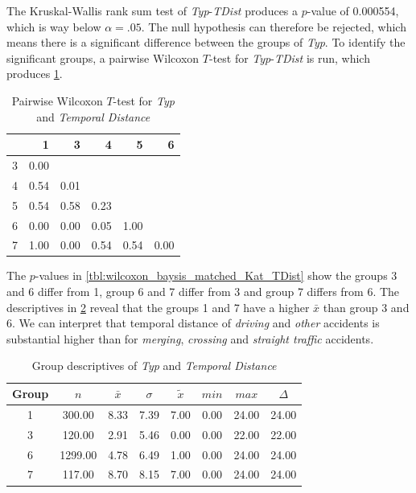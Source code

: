 The Kruskal-Wallis rank sum test of \textit{Typ}-\textit{TDist} produces a $p$-value of 0.000554, which is way below $\alpha=.05$. The null hypothesis can therefore be rejected, which means there is a significant difference between the groups of \textit{Typ}. To identify the significant groups, a pairwise Wilcoxon $T$-test for \textit{Typ}-\textit{TDist} is run, which produces \cref{tbl:wilcoxon_baysis_matched_Typ_TDist}. 
\begin{table}[ht]
	\tiny
	\centering
	\begin{tabular}{rrrrrr}
		\toprule
		& 1 & 3 & 4 & 5 & 6 \\ 
		\midrule
		3 & 0.00 &  &  &  &  \\ 
		4 & 0.54 & 0.01 &  &  &  \\ 
		5 & 0.54 & 0.58 & 0.23 &  &  \\ 
		6 & 0.00 & 0.00 & 0.05 & 1.00 &  \\ 
		7 & 1.00 & 0.00 & 0.54 & 0.54 & 0.00 \\ 
		\bottomrule
	\end{tabular}
	\caption{Pairwise Wilcoxon $T$-test for \textit{Typ} and \textit{Temporal Distance}}
	\label{tbl:wilcoxon_baysis_matched_Typ_TDist}
\end{table}
The $p$-values in \cref{tbl:wilcoxon_baysis_matched_Kat_TDist} show the groups 3 and 6 differ from 1, group 6 and 7 differ from 3 and group 7 differs from 6. The descriptives in \cref{tbl:descriptives_baysis_matched_Typ_TDist} reveal that the groups 1 and 7 have a higher $\bar{x}$ than group 3 and 6. We can interpret that temporal distance of \textit{driving} and \textit{other} accidents is substantial higher than for \textit{merging}, \textit{crossing} and \textit{straight traffic} accidents. 
\begin{table}[ht]
	\tiny
	\centering
	\begin{tabular}{c|c|c|c|c|c|c|c}
		\toprule
		Group & $n$ & $\bar{x}$ & $\sigma$ & $\tilde{x}$ & $min$ & $max$ & $\Delta$ \\ 
		\midrule
		1 & 300.00 & 8.33 & 7.39 & 7.00 & 0.00 & 24.00 & 24.00 \\ 
		3 & 120.00 & 2.91 & 5.46 & 0.00 & 0.00 & 22.00 & 22.00 \\ 
		6 & 1299.00 & 4.78 & 6.49 & 1.00 & 0.00 & 24.00 & 24.00 \\ 
		7 & 117.00 & 8.70 & 8.15 & 7.00 & 0.00 & 24.00 & 24.00 \\ 
		\bottomrule
	\end{tabular}
	\caption{Group descriptives of \textit{Typ} and \textit{Temporal Distance}}
	\label{tbl:descriptives_baysis_matched_Typ_TDist}
\end{table}

